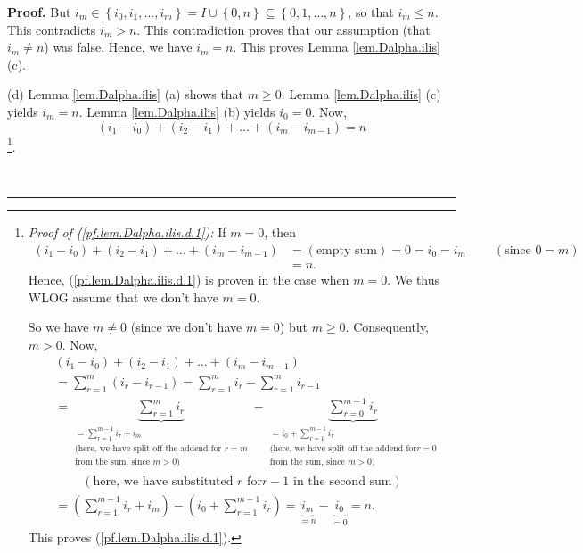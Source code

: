 \documentclass[numbers=enddot,12pt,final,onecolumn,notitlepage,abstracton]{scrartcl}
\theoremstyle{definition}
\newenvironment{proof}[1][Proof]{\noindent\textbf{#1.} }{\ \rule{0.5em}{0.5em}}
\let\sumnonlimits\sum
\renewcommand{\sum}{\sumnonlimits\limits}
\newenvironment{verlong}{}{}
\begin{document}
\begin{verlong}
\begin{footnotesize}
\begin{proof}
But $i_{m}\in\left\{  i_{0},i_{1},\ldots,i_{m}\right\}  =I\cup\left\{
0,n\right\}  \subseteq\left\{  0,1,\ldots,n\right\}  $, so that $i_{m}\leq n$.
This contradicts $i_{m}>n$. This contradiction proves that our assumption
(that $i_{m}\neq n$) was false. Hence, we have $i_{m}=n$. This proves Lemma
\ref{lem.Dalpha.ilis} (c).

(d) Lemma \ref{lem.Dalpha.ilis} (a) shows that $m\geq0$. Lemma
\ref{lem.Dalpha.ilis} (c) yields $i_{m}=n$. Lemma \ref{lem.Dalpha.ilis} (b)
yields $i_{0}=0$. Now,%
\begin{equation}
\left(  i_{1}-i_{0}\right)  +\left(  i_{2}-i_{1}\right)  +\ldots+\left(
i_{m}-i_{m-1}\right)  =n \label{pf.lem.Dalpha.ilis.d.1}%
\end{equation}
\footnote{\textit{Proof of (\ref{pf.lem.Dalpha.ilis.d.1}):} If $m=0$, then%
\begin{align*}
\left(  i_{1}-i_{0}\right)  +\left(  i_{2}-i_{1}\right)  +\ldots+\left(
i_{m}-i_{m-1}\right)   &  =\left(  \text{empty sum}\right)  =0=i_{0}%
=i_{m}\ \ \ \ \ \ \ \ \ \ \left(  \text{since }0=m\right) \\
&  =n.
\end{align*}
Hence, (\ref{pf.lem.Dalpha.ilis.d.1}) is proven in the case when $m=0$. We
thus WLOG assume that we don't have $m=0$.
\par
So we have $m\neq0$ (since we don't have $m=0$) but $m\geq0$. Consequently,
$m>0$. Now,%
\begin{align}
&  \left(  i_{1}-i_{0}\right)  +\left(  i_{2}-i_{1}\right)  +\ldots+\left(
i_{m}-i_{m-1}\right) \nonumber\\
&  =\sum_{r=1}^{m}\left(  i_{r}-i_{r-1}\right)  =\sum_{r=1}^{m}i_{r}%
-\sum_{r=1}^{m}i_{r-1}\nonumber\\
&  =\underbrace{\sum_{r=1}^{m}i_{r}}_{\substack{=\sum_{r=1}^{m-1}i_{r}%
+i_{m}\\\text{(here, we have split off the addend for }r=m\\\text{from the
sum, since }m>0\text{)}}}-\underbrace{\sum_{r=0}^{m-1}i_{r}}_{\substack{=i_{0}%
+\sum_{r=1}^{m-1}i_{r}\\\text{(here, we have split off the addend for
}r=0\\\text{from the sum, since }m>0\text{)}}}\nonumber\\
&  \ \ \ \ \ \ \ \ \ \ \left(  \text{here, we have substituted }r\text{ for
}r-1\text{ in the second sum}\right) \nonumber\\
&  =\left(  \sum_{r=1}^{m-1}i_{r}+i_{m}\right)  -\left(  i_{0}+\sum
_{r=1}^{m-1}i_{r}\right)  =\underbrace{i_{m}}_{=n}-\underbrace{i_{0}}%
_{=0}=n.\nonumber
\end{align}
This proves (\ref{pf.lem.Dalpha.ilis.d.1}).}.


\end{proof}
\end{footnotesize}
\end{verlong}
\end{document}
